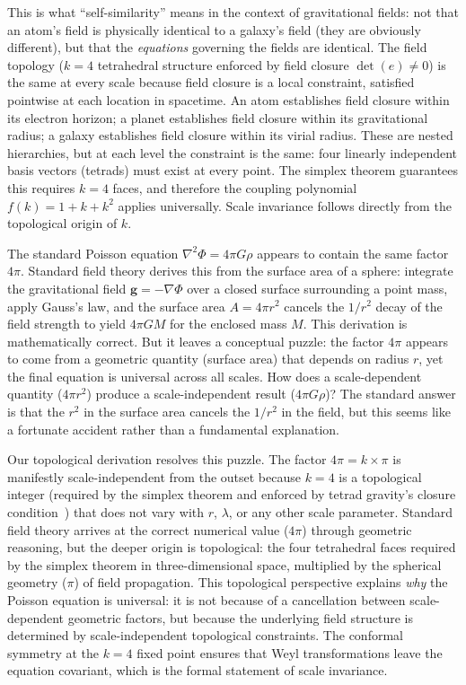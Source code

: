 \documentclass[aps,prd,preprint,superscriptaddress,showpacs,preprintnumbers,amsmath,amssymb,nofootinbib]{revtex4-2}
\begin{document}

This is what ``self-similarity'' means in the context of gravitational fields: not that an atom's field is physically identical to a galaxy's field (they are obviously different), but that the \emph{equations} governing the fields are identical. The field topology ($k=4$ tetrahedral structure enforced by field closure $\det(e) \neq 0$) is the same at every scale because field closure is a local constraint, satisfied pointwise at each location in spacetime. An atom establishes field closure within its electron horizon; a planet establishes field closure within its gravitational radius; a galaxy establishes field closure within its virial radius. These are nested hierarchies, but at each level the constraint is the same: four linearly independent basis vectors (tetrads) must exist at every point. The simplex theorem guarantees this requires $k=4$ faces, and therefore the coupling polynomial $f(k) = 1 + k + k^2$ applies universally. Scale invariance follows directly from the topological origin of $k$.

The standard Poisson equation $\nabla^2\Phi = 4\pi G\rho$ appears to contain the same factor $4\pi$. Standard field theory derives this from the surface area of a sphere: integrate the gravitational field $\mathbf{g} = -\nabla\Phi$ over a closed surface surrounding a point mass, apply Gauss's law, and the surface area $A = 4\pi r^2$ cancels the $1/r^2$ decay of the field strength to yield $4\pi G M$ for the enclosed mass $M$. This derivation is mathematically correct. But it leaves a conceptual puzzle: the factor $4\pi$ appears to come from a geometric quantity (surface area) that depends on radius $r$, yet the final equation is universal across all scales. How does a scale-dependent quantity ($4\pi r^2$) produce a scale-independent result ($4\pi G\rho$)? The standard answer is that the $r^2$ in the surface area cancels the $1/r^2$ in the field, but this seems like a fortunate accident rather than a fundamental explanation.

Our topological derivation resolves this puzzle. The factor $4\pi = k\times\pi$ is manifestly scale-independent from the outset because $k=4$ is a topological integer (required by the simplex theorem and enforced by tetrad gravity's closure condition~\cite{mtw1973,wald1984}) that does not vary with $r$, $\lambda$, or any other scale parameter. Standard field theory arrives at the correct numerical value ($4\pi$) through geometric reasoning, but the deeper origin is topological: the four tetrahedral faces required by the simplex theorem in three-dimensional space, multiplied by the spherical geometry ($\pi$) of field propagation. This topological perspective explains \emph{why} the Poisson equation is universal: it is not because of a cancellation between scale-dependent geometric factors, but because the underlying field structure is determined by scale-independent topological constraints. The conformal symmetry at the $k=4$ fixed point ensures that Weyl transformations leave the equation covariant, which is the formal statement of scale invariance.
\end{document}
